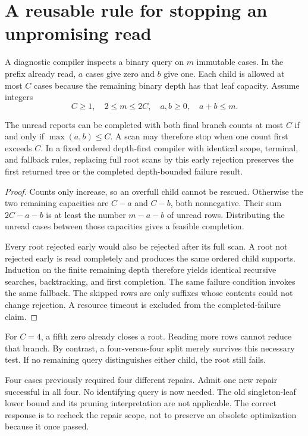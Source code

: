 \section{A reusable rule for stopping an unpromising read}
A diagnostic compiler inspects a binary query on $m$ immutable cases. In the prefix already read, $a$ cases give zero and $b$ give one. Each child is allowed at most $C$ cases because the remaining binary depth has that leaf capacity. Assume integers
\[
C\ge1,\quad 2\le m\le2C,\quad a,b\ge0,\quad a+b\le m.
\]

\begin{Coreproposition}\label{Core:r:prefix}
The unread reports can be completed with both final branch counts at most $C$ if and only if $\max(a,b)\le C$. A scan may therefore stop when one count first exceeds $C$. In a fixed ordered depth-first compiler with identical scope, terminal, and fallback rules, replacing full root scans by this early rejection preserves the first returned tree or the completed depth-bounded failure result.
\end{Coreproposition}
\begin{proof}
Counts only increase, so an overfull child cannot be rescued. Otherwise the two remaining capacities are $C-a$ and $C-b$, both nonnegative. Their sum $2C-a-b$ is at least the number $m-a-b$ of unread rows. Distributing the unread cases between those capacities gives a feasible completion.

Every root rejected early would also be rejected after its full scan. A root not rejected early is read completely and produces the same ordered child supports. Induction on the finite remaining depth therefore yields identical recursive searches, backtracking, and first completion. The same failure condition invokes the same fallback. The skipped rows are only suffixes whose contents could not change rejection. A resource timeout is excluded from the completed-failure claim.
\end{proof}

For $C=4$, a fifth zero already closes a root. Reading more rows cannot reduce that branch. By contrast, a four-versus-four split merely survives this necessary test. If no remaining query distinguishes either child, the root still fails.

\begin{Corecounterexample}\label{Core:ce:universal}
Four cases previously required four different repairs. Admit one new repair successful in all four. No identifying query is now needed. The old singleton-leaf lower bound and its pruning interpretation are not applicable. The correct response is to recheck the repair scope, not to preserve an obsolete optimization because it once passed.
\end{Corecounterexample}

